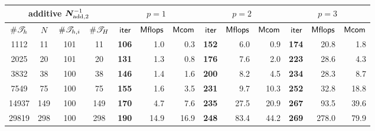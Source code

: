  {\footnotesize
      \tabcolsep 4pt
  \begin{tabular}{cccc|rrr|rrr|rrr}
  \hline
  \multicolumn{4}{c|}{ {\small\bf additive} $\bm{N}_{\mathrm{add},2}^{-1}$     }  &  \multicolumn{3}{c|}{$p=1$} & \multicolumn{3}{c|}{$p=2$}&   \multicolumn{3}{c}{$p=3$}\\
  \hline
     $ \# {{\mathscr T}_h} $   &
     $ N $ & $ \# {{\mathscr T}_{h,i}} $   &
     $ \# {{\mathscr T}_H} $ & 
     $ \mathsf{iter} $ & $ \mathsf{Mflops} $ & $ \mathsf{Mcom} $ & 
     $ \mathsf{iter} $ & $ \mathsf{Mflops} $ & $ \mathsf{Mcom} $ & 
     $ \mathsf{iter} $ & $ \mathsf{Mflops} $ & $ \mathsf{Mcom} $ \\ 
  \hline
    1112 &       11 &      101 &       11
& {\bf      106}  &        1.0 &        0.3
& {\bf      152}  &        6.0 &        0.9
& {\bf      174}  &       20.8 &        1.8
 \\
    2025 &       20 &      101 &       20
& {\bf      131}  &        1.3 &        0.8
& {\bf      176}  &        7.6 &        2.0
& {\bf      223}  &       28.6 &        4.3
 \\
    3832 &       38 &      100 &       38
& {\bf      146}  &        1.4 &        1.6
& {\bf      200}  &        8.2 &        4.5
& {\bf      234}  &       28.3 &        8.7
 \\
    7549 &       75 &      100 &       75
& {\bf      155}  &        1.6 &        3.5
& {\bf      231}  &        9.7 &       10.3
& {\bf      252}  &       32.8 &       18.8
 \\
   14937 &      149 &      100 &      149
& {\bf      170}  &        4.7 &        7.6
& {\bf      235}  &       27.5 &       20.9
& {\bf      267}  &       93.5 &       39.6
 \\
   29819 &      298 &      100 &      298
& {\bf      190}  &       14.9 &       16.9
& {\bf      248}  &       83.4 &       44.2
& {\bf      269}  &      278.0 &       79.9
 \\
  \hline
  \end{tabular}
 }
